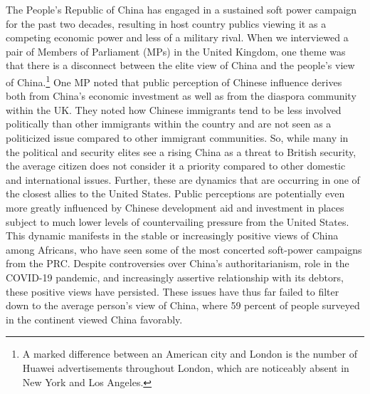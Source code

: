 The People's Republic of China has engaged in a sustained soft power campaign for the past two decades, resulting in host country publics viewing it as a competing economic power and less of a military rival. When we interviewed a pair of Members of Parliament (MPs) in the United Kingdom, one theme was that there is a disconnect between the elite view of China and the people's view of China.\autocite{mpone20190717,mptwo20190717}\footnote{A marked difference between an American city and London is the number of Huawei advertisements throughout London, which are noticeably absent in New York and Los Angeles.} One MP noted that public perception of Chinese influence derives both from China's economic investment as well as from the diaspora community within the UK. They noted how Chinese immigrants tend to be less involved politically than other immigrants within the country and are not seen as a politicized issue compared to other immigrant communities.\autocite{mptwo20190717} So, while many in the political and security elites see a rising China as a threat to British security, the average citizen does not consider it a priority compared to other domestic and international issues. Further, these are dynamics that are occurring in one of the closest allies to the United States. Public perceptions are potentially even more greatly influenced by Chinese development aid and investment in places subject to much lower levels of countervailing pressure from the United States. This dynamic manifests in the stable or increasingly positive views of China among Africans, who have seen some of the most concerted soft-power campaigns from the PRC. Despite controversies over China's authoritarianism, role in the COVID-19 pandemic, and increasingly assertive relationship with its debtors, these positive views have persisted. These issues have thus far failed to filter down to the average person's view of China, where 59 percent of people surveyed in the continent viewed China favorably.\autocite{afrobarometer2020}

